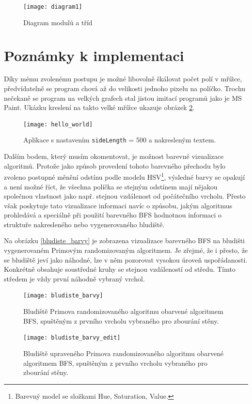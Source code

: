 \documentclass[12pt]{report}			%
\begin{document}
  			
  			
  			\begin{figure}[h]
  			\texttt{[image: diagram1]}\caption{Diagram modulů a tříd}\label{app_diagram}\end{figure}
		
		\newpage
		\section{Poznámky k implementaci}
		Díky mému zvolenému postupu je možné libovolně škálovat počet polí v mřížce, předvídatelně se program chová až do velikosti jednoho pixelu na políčko. Trochu nečekaně se program na velkých grafech stal jistou imitací programů jako je MS Paint. Ukázku kreslení na takto velké mřížce ukazuje obrázek \ref{hello}.
		\begin{figure}[h]
		  			\texttt{[image: hello\_world]}\caption{Aplikace s nastavením \texttt{sideLength} = 500 a nakresleným textem.}\label{hello}\end{figure}
		
		Dalším bodem, který musím okomentovat, je možnost barevné vizualizace algoritmů. Protože jako způsob provedení tohoto barevného přechodu bylo zvoleno postupné měnění odstínu podle modelu HSV\footnote{Barevný model se složkami Hue, Saturation, Value.}, výsledné barvy se opakují a není možné říct, že všechna políčka se stejným odstínem mají nějakou společnou vlastnost jako např. stejnou vzdálenost od počátečního vrcholu. Přesto však poskytuje tato vizualizace informaci navíc o způsobu, jakým algoritmus prohledává a speciálně při použití barevného BFS hodnotnou informaci o struktuře nakresleného nebo vygenerovaného bludiště. 
		
		Na obrázku \ref{bludiste_barvy} je zobrazena vizualizace barevného BFS na bludišti vygenerovaném Primovým randomizovaným algoritmem. Je zřejmé, že i přesto, že se bludiště jeví jako náhodné, lze v něm pozorovat vysokou úroveň uspořádanosti. Konkrétně obsahuje soustředné kruhy se stejnou vzdáleností od středu. Tímto středem je vždy první náhodně vybraný vrchol. %
		
\begin{figure}[h]
\begin{minipage}[outer sep=0]{\textwidth}
\begin{minipage}[t]{0.48\textwidth}
			
  			\texttt{[image: bludiste\_barvy]}\caption{Bludiště Primova randomizovaného algoritmu obarvené algoritmem BFS, spuštěným z prvního vrcholu vybraného pro zbourání stěny.}\label{bludiste_barvy}
  			
    \end{minipage}\hfill
    \begin{minipage}[t]{0.48\textwidth}
\texttt{[image: bludiste\_barvy\_edit]}\caption{Bludiště upraveného Primova randomizovaného algoritmu obarvené algoritmem BFS, spuštěným z prvního vrcholu vybraného pro zbourání stěny.}\label{bludiste_barvy_edit}
    \end{minipage}
    \end{minipage}\vspace{1ex}
\end{figure}
  			
\end{document}
